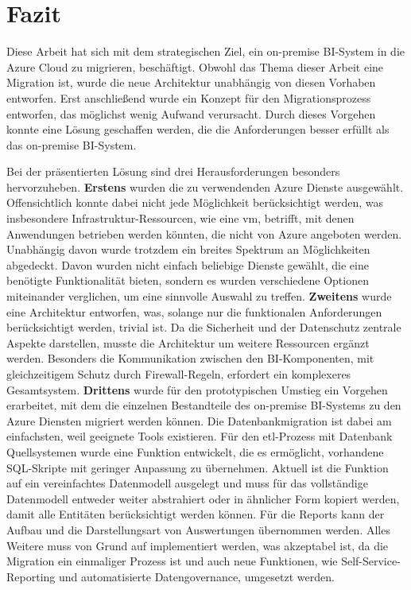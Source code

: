 \chapter{Fazit} \label{ch:zusammenfassung}
Diese Arbeit hat sich mit dem strategischen Ziel, ein on-premise BI-System in die Azure Cloud zu migrieren, beschäftigt. Obwohl das Thema dieser Arbeit eine Migration ist, wurde die neue Architektur unabhängig von diesen Vorhaben entworfen. Erst anschließend wurde ein Konzept für den Migrationsprozess entworfen, das möglichst wenig Aufwand verursacht. Durch dieses Vorgehen konnte eine Lösung geschaffen werden, die die Anforderungen besser erfüllt als das on-premise BI-System.

Bei der präsentierten Lösung sind drei Herausforderungen besonders hervorzuheben. \textbf{Erstens} wurden die zu verwendenden Azure Dienste ausgewählt. Offensichtlich konnte dabei nicht jede Möglichkeit berücksichtigt werden, was insbesondere Infrastruktur-Ressourcen, wie eine \ac{vm}, betrifft, mit denen Anwendungen betrieben werden könnten, die nicht von Azure angeboten werden. Unabhängig davon wurde trotzdem ein breites Spektrum an Möglichkeiten abgedeckt. Davon wurden nicht einfach beliebige Dienste gewählt, die eine benötigte Funktionalität bieten, sondern es wurden verschiedene Optionen miteinander verglichen, um eine sinnvolle Auswahl zu treffen. \textbf{Zweitens} wurde eine Architektur entworfen, was, solange nur die funktionalen Anforderungen berücksichtigt werden, trivial ist. Da die Sicherheit und der Datenschutz zentrale Aspekte darstellen, musste die Architektur um weitere Ressourcen ergänzt werden. Besonders die Kommunikation zwischen den BI-Komponenten, mit gleichzeitigem Schutz durch Firewall-Regeln, erfordert ein komplexeres Gesamtsystem. \textbf{Drittens} wurde für den prototypischen Umstieg ein Vorgehen erarbeitet, mit dem die einzelnen Bestandteile des on-premise BI-Systems zu den Azure Diensten migriert werden können. Die Datenbankmigration ist dabei am einfachsten, weil geeignete Tools existieren. Für den \ac{etl}-Prozess mit Datenbank Quellsystemen wurde eine Funktion entwickelt, die es ermöglicht, vorhandene SQL-Skripte mit geringer Anpassung zu übernehmen. Aktuell ist die Funktion auf ein vereinfachtes Datenmodell ausgelegt und muss für das vollständige Datenmodell entweder weiter abstrahiert oder in ähnlicher Form kopiert werden, damit alle Entitäten berücksichtigt werden können. Für die Reports kann der Aufbau und die Darstellungsart von Auswertungen übernommen werden. Alles Weitere muss von Grund auf implementiert werden, was akzeptabel ist, da die Migration ein einmaliger Prozess ist und auch neue Funktionen, wie Self-Service-Reporting und automatisierte Datengovernance, umgesetzt werden.

